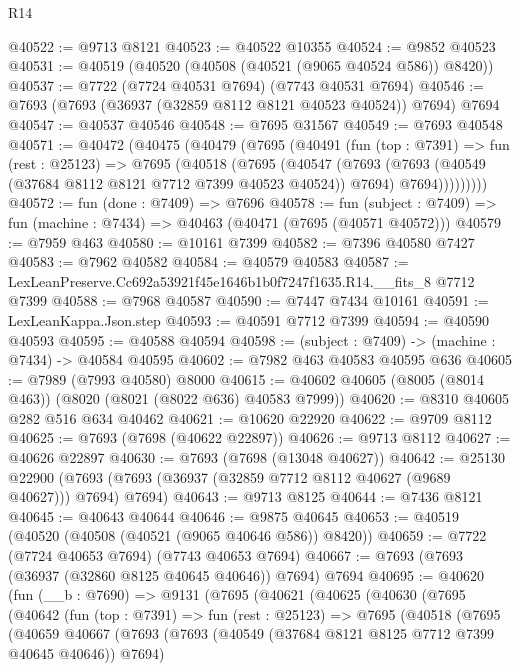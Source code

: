 \begin{lexlean}{R14}
\begin{coremodule}
@40522 := @9713 @8121
@40523 := @40522 @10355
@40524 := @9852 @40523
@40531 := @40519 (@40520 (@40508 (@40521 (@9065 @40524 @586)) @8420))
@40537 := @7722 (@7724 @40531 @7694) (@7743 @40531 @7694)
@40546 := @7693 (@7693 (@36937 (@32859 @8112 @8121 @40523 @40524)) @7694) @7694
@40547 := @40537 @40546
@40548 := @7695 @31567
@40549 := @7693 @40548
@40571 := @40472
    (@40475
      (@40479
        (@7695
          (@40491
            (fun (top : @7391) =>
            fun (rest : @25123) =>
            @7695
              (@40518
                (@7695
                  (@40547
                    (@7693
                      (@7693 (@40549 (@37684 @8112 @8121 @7712 @7399 @40523 @40524)) @7694)
                      @7694)))))))))
@40572 := fun (done : @7409) => @7696
@40578 := fun (subject : @7409) => fun (machine : @7434) => @40463 (@40471 (@7695 (@40571 @40572)))
@40579 := @7959 @463
@40580 := @10161 @7399
@40582 := @7396 @40580 @7427
@40583 := @7962 @40582
@40584 := @40579 @40583
@40587 := LexLeanPreserve.Cc692a53921f45e1646b1b0f7247f1635.R14.__fits_8 @7712 @7399
@40588 := @7968 @40587
@40590 := @7447 @7434 @10161
@40591 := LexLeanKappa.Json.step
@40593 := @40591 @7712 @7399
@40594 := @40590 @40593
@40595 := @40588 @40594
@40598 := (subject : @7409) -> (machine : @7434) -> @40584 @40595
@40602 := @7982 @463 @40583 @40595 @636
@40605 := @7989 (@7993 @40580) @8000
@40615 := @40602 @40605 (@8005 (@8014 @463)) (@8020 (@8021 (@8022 @636) @40583 @7999))
@40620 := @8310 @40605 @282 @516 @634 @40462
@40621 := @10620 @22920
@40622 := @9709 @8112
@40625 := @7693 (@7698 (@40622 @22897))
@40626 := @9713 @8112
@40627 := @40626 @22897
@40630 := @7693 (@7698 (@13048 @40627))
@40642 := @25130
    @22900
    (@7693 (@7693 (@36937 (@32859 @7712 @8112 @40627 (@9689 @40627))) @7694) @7694)
@40643 := @9713 @8125
@40644 := @7436 @8121
@40645 := @40643 @40644
@40646 := @9875 @40645
@40653 := @40519 (@40520 (@40508 (@40521 (@9065 @40646 @586)) @8420))
@40659 := @7722 (@7724 @40653 @7694) (@7743 @40653 @7694)
@40667 := @7693 (@7693 (@36937 (@32860 @8125 @40645 @40646)) @7694) @7694
@40695 := @40620
    (fun (__b : @7690) =>
    @9131
      (@7695
        (@40621
          (@40625
            (@40630
              (@7695
                (@40642
                  (fun (top : @7391) =>
                  fun (rest : @25123) =>
                  @7695
                    (@40518
                      (@7695
                        (@40659
                          @40667
                          (@7693
                            (@7693 (@40549 (@37684 @8121 @8125 @7712 @7399 @40645 @40646)) @7694)

\end{coremodule}
\end{lexlean}
